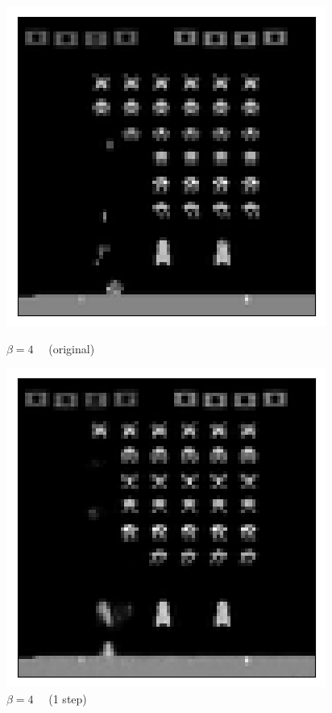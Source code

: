 \begin{figure}[h!]
\begin{multicols}{4}
    \includegraphics[scale=0.4]{figures/results/weighted_average/beta_4_posterior_sample_original.png}
    \caption{$\beta=4\quad$ (original)}
    \includegraphics[scale=0.4]{figures/results/weighted_average/beta_4_posterior_sample_0.png}
    \caption{$\beta=4\quad$ (1 step)}

\end{multicols}
\end{figure}

